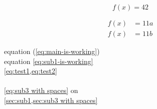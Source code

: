 \documentclass{article}
\begin{document}
\begin{equation}
  f(x) = 42
  \label{eq:main-is-working}
\end{equation}

\begin{subequations}
  \begin{align}
    \label{eq:test11a}
    f(x) &= 11a \\
    \label{eq:test11b}
    f(x) &= 11b
  \end{align}
\end{subequations}


equation (\ref{eq:main-is-working}) \\
equation \eqref{eq:sub1-is-working} \\
\cref{eq:test1,eq:test2} \\
 \\
\cref{eq:sub3 with spaces} on  \\
\cref{sec:sub1,sec:sub3 with spaces} \\
 \\








\end{document}
